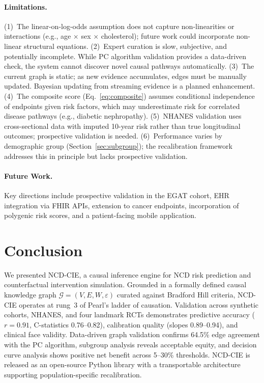 \documentclass[runningheads]{llncs}
\begin{document}
\paragraph{Limitations.}
(1)~The linear-on-log-odds assumption does not capture non-linearities
or interactions (e.g., age $\times$ sex $\times$ cholesterol); future
work could incorporate non-linear structural equations.
(2)~Expert curation is slow, subjective, and potentially incomplete.
While PC algorithm validation provides a data-driven check, the system
cannot discover novel causal pathways automatically.
(3)~The current graph is static; as new evidence accumulates, edges
must be manually updated.  Bayesian updating from streaming evidence
is a planned enhancement.
(4)~The composite score (Eq.~\ref{eq:composite}) assumes conditional
independence of endpoints given risk factors, which may underestimate
risk for correlated disease pathways (e.g., diabetic nephropathy).
(5)~NHANES validation uses cross-sectional data with imputed 10-year
risk rather than true longitudinal outcomes; prospective validation is
needed.
(6)~Performance varies by demographic group
(Section~\ref{sec:subgroup}); the recalibration framework addresses
this in principle but lacks prospective validation.

\paragraph{Future Work.}
Key directions include prospective validation in the EGAT cohort,
EHR integration via FHIR APIs, extension to cancer endpoints,
incorporation of polygenic risk scores, and a patient-facing mobile
application.

\section{Conclusion}\label{sec:conclusion}

We presented NCD-CIE, a causal inference engine for NCD risk
prediction and counterfactual intervention simulation.  Grounded in a
formally defined causal knowledge graph
$\mathcal{G} = (V, E, W, \varepsilon)$ curated against Bradford Hill
criteria, NCD-CIE operates at rung~3 of Pearl's ladder of causation.
Validation across synthetic cohorts, NHANES, and four landmark RCTs
demonstrates predictive accuracy ($r = 0.91$, C-statistics
0.76--0.82), calibration quality (slopes 0.89--0.94), and clinical
face validity.  Data-driven graph validation confirms 64.5\% edge
agreement with the PC algorithm, subgroup analysis reveals acceptable
equity, and decision curve analysis shows positive net benefit across
5--30\% thresholds.  NCD-CIE is released as an open-source Python
library with a transportable architecture supporting
population-specific recalibration.
\end{document}
